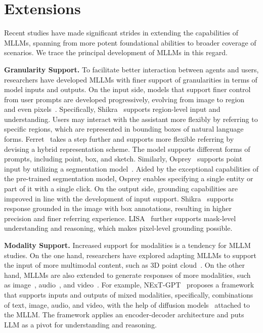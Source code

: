 \section{Extensions}
\label{sec:extensions}

Recent studies have made significant strides in extending the capabilities of MLLMs, spanning from more potent foundational abilities to broader coverage of scenarios. We trace the principal development of MLLMs in this regard.

\noindent \textbf{Granularity Support.}
To facilitate better interaction between agents and users, researchers have developed MLLMs with finer support of granularities in terms of model inputs and outputs.
On the input side, models that support finer control from user prompts are developed progressively, evolving from image to region~\cite{chen2023shikra,zhang2023gpt4roi,xuan2023pink} and even pixels~\cite{yuan2023osprey,rasheed2023glamm,you2023ferret}.
Specifically, Shikra~\cite{chen2023shikra} supports region-level input and understanding. Users may interact with the assistant more flexibly by referring to specific regions, which are represented in bounding boxes of natural language forms.
Ferret~\cite{you2023ferret} takes a step further and supports more flexible referring by devising a hybrid representation scheme. The model supports different forms of prompts, including point, box, and sketch. 
Similarly, Osprey~\cite{yuan2023osprey} supports point input by utilizing a segmentation model~\cite{sam}. Aided by the exceptional capabilities of the pre-trained segmentation model, Osprey enables specifying a single entity or part of it with a single click.
On the output side, grounding capabilities are improved in line with the development of input support. 
Shikra~\cite{chen2023shikra} supports response grounded in the image with box annotations, resulting in higher precision and finer referring experience.
LISA~\cite{lai2023lisa} further supports mask-level understanding and reasoning, which makes pixel-level grounding possible. 

\noindent \textbf{Modality Support.}
Increased support for modalities is a tendency for MLLM studies.
On the one hand, researchers have explored adapting MLLMs to support the input of more multimodal content, such as 3D point cloud~\cite{xu2023pointllm,chen2023ll3da,huang2023embodied,hong20233d}.
On the other hand, MLLMs are also extended to generate responses of more modalities, such as image~\cite{emu,zhan2024anygpt,wu2023next,aiello2023jointly}, audio~\cite{zhang2023speechgpt,rubenstein2023audiopalm,zhan2024anygpt,wu2023next}, and video~\cite{wu2023next,wang2024modaverse}. 
For example, NExT-GPT~\cite{wu2023next} proposes a framework that supports inputs and outputs of mixed modalities, specifically, combinations of text, image, audio, and video, with the help of diffusion models~\cite{ho2020denoising,rombach2022high} attached to the MLLM. The framework applies an encoder-decoder architecture and puts LLM as a pivot for understanding and reasoning.

